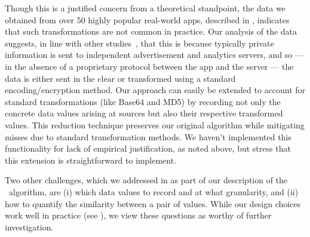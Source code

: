 Though this is a justified concern from a theoretical standpoint, the data we obtained from over 50 highly popular real-world apps, described in , indicates that such transformations are not common in practice. Our analysis of the data suggests, in line with other studies~\cite{HHJSW:CCS11}, that this is because typically private information is sent to independent advertisement and analytics servers, and so --- in the absence of a proprietary protocol between the app and the server --- the data is either sent in the clear or transformed using a standard encoding/encryption method.
%
Our approach can easily be extended to account for standard transformations (like Base64 and MD5) by recording not only the concrete data values arising at sources but also their respective transformed values. This reduction technique preserves our original algorithm while mitigating misses due to standard transformation methods. We haven't implemented this functionality for lack of empirical justification, as noted above, but stress that this extension is straightforward to implement.


Two other challenges, which we addressed in  as part of our description of the \Tool\ algorithm, are (i) which data values to record and at what granularity, and (ii) how to quantify the similarity between a pair of values. While our design choices work well in practice (see ), we view these questions as worthy of further investigation.
